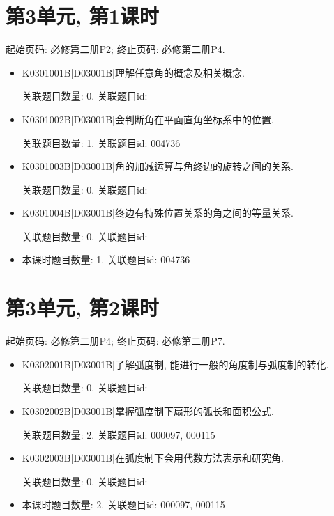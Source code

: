 \section*{第3单元, 第1课时}
起始页码: 必修第二册P2; 终止页码: 必修第二册P4.
\begin{itemize}
\item K0301001B|D03001B|理解任意角的概念及相关概念.

关联题目数量: 0. 关联题目id: 

\item K0301002B|D03001B|会判断角在平面直角坐标系中的位置.

关联题目数量: 1. 关联题目id: 004736

\item K0301003B|D03001B|角的加减运算与角终边的旋转之间的关系.

关联题目数量: 0. 关联题目id: 

\item K0301004B|D03001B|终边有特殊位置关系的角之间的等量关系.

关联题目数量: 0. 关联题目id: 

\item 本课时题目数量: 1. 关联题目id: 004736

\end{itemize}

\section*{第3单元, 第2课时}
起始页码: 必修第二册P4; 终止页码: 必修第二册P7.
\begin{itemize}
\item K0302001B|D03001B|了解弧度制, 能进行一般的角度制与弧度制的转化.

关联题目数量: 0. 关联题目id: 

\item K0302002B|D03001B|掌握弧度制下扇形的弧长和面积公式.

关联题目数量: 2. 关联题目id: 000097, 000115

\item K0302003B|D03001B|在弧度制下会用代数方法表示和研究角.

关联题目数量: 0. 关联题目id: 

\item 本课时题目数量: 2. 关联题目id: 000097, 000115

\end{itemize}

